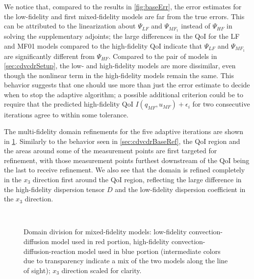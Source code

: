 We notice that, compared to the results in \cref{fig:baseErr}, the error estimates for the low-fidelity and first mixed-fidelity models are far from the true errors. This can be attributed to the linearization about $\Psi_{LF}$ and $\Psi_{MF_{1}}$ instead of $\Psi_{HF}$ in solving the supplementary adjoints; the large differences in the QoI for the LF and MF01 models compared to the high-fidelity QoI indicate that $\Psi_{LF}$ and $\Psi_{MF_{1}}$ are significantly different from $\Psi_{HF}$. Compared to the pair of models in \cref{sec:cdvcdrSetup}, the low- and high-fidelity models are more dissimilar, even though the nonlinear term in the high-fidelity models remain the same. %
This behavior suggests that one should use more than just the error estimate to decide when to stop the adaptive algorithm; a possible additional criterion could be to require that the predicted high-fidelity QoI $I(q_{MF},u_{MF})+\epsilon_i$ for two consecutive iterations agree to within some tolerance. %

The multi-fidelity domain refinements for the five adaptive iterations are shown in \cref{fig:divvy3D_diffmesh}. Similarly to the behavior seen in \cref{sec:cdvcdrBaseRef}, the QoI region and the areas around some of the measurement points are first targeted for refinement, with those measurement points furthest downstream of the QoI being the last to receive refinement. We also see that the domain is refined completely in the $x_3$ direction first around the QoI region, reflecting the large difference in the high-fidelity dispersion tensor $D$ and the low-fidelity dispersion coefficient in the $x_3$ direction.
%
\begin{figure}[htbp]
\centering
{}
 \\
\caption{Domain division for mixed-fidelity models: low-fidelity convection-diffusion model used in red portion, high-fidelity convection-diffusion-reaction model used in blue portion (intermediate colors due to transparency indicate a mix of the two models along the line of sight); $x_3$ direction scaled for clarity.}
\label{fig:divvy3D_diffmesh}
\end{figure}
%

